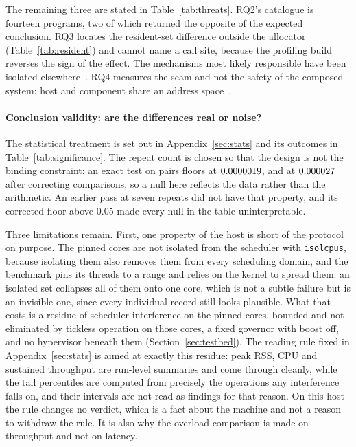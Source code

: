 \documentclass[english,oneside,a4paper,censored,csm,software-track-2020]{HYthesisML}
\begin{document}
\begin{appendices}
The remaining three are stated in Table~\ref{tab:threats}. RQ2's catalogue is fourteen
programs, two of which returned the opposite of the expected conclusion. RQ3 locates the
resident-set difference outside the allocator (Table~\ref{tab:resident}) and cannot name a call
site, because the profiling build reverses the sign of the effect. The mechanisms most likely
responsible have been isolated elsewhere~\cite{zhang2022runtime,harris2023morello}. RQ4
measures the seam and not the safety of the composed system: host and component share an address
space~\cite{rivera2021galeed,kirth2022pkrusafe}.

\paragraph{Conclusion validity: are the differences real or noise?}
The statistical treatment is set out in Appendix~\ref{sec:stats} and its outcomes in
Table~\ref{tab:significance}. The repeat count is chosen so that the design is not the binding
constraint: an exact test on \NRepeats{} pairs floors at $0.0000019$, and at
$0.000027$ after correcting \NTests{} comparisons, so a null here reflects the data rather
than the arithmetic. An earlier pass at seven repeats did not have that property, and its
corrected floor above $0.05$ made every null in the table uninterpretable.

Three limitations remain. First, one property of the host is short of the protocol on purpose. The
pinned cores are not isolated from the scheduler with \texttt{isolcpus}, because isolating them
also removes them from every scheduling domain, and the benchmark pins its threads to a range and
relies on the kernel to spread them: an isolated set collapses all of them onto one core, which is
not a subtle failure but is an invisible one, since every individual record still looks plausible.
What that costs is a residue of scheduler interference on the pinned cores, bounded and not
eliminated by tickless operation on those cores, a fixed governor with boost off, and no
hypervisor beneath them (Section~\ref{sec:testbed}). The reading rule fixed in
Appendix~\ref{sec:stats} is aimed at exactly this residue: peak RSS, CPU and sustained throughput
are run-level summaries and come through cleanly, while the tail percentiles are computed from
precisely the operations any interference falls on, and their intervals are not read as findings
for that reason. On this host the rule changes no verdict, which is a fact about the machine and
not a reason to withdraw the rule. It is also why the overload comparison is made on throughput
and not on latency.


\end{appendices}
\end{document}

